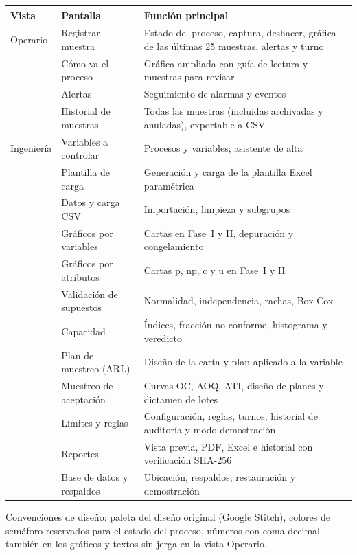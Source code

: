 \documentclass[11pt,a4paper]{article}
\begin{document}
\begin{tabularx}{\linewidth}{@{}P{2.1cm}P{4.4cm}L@{}}
\toprule
\textbf{Vista} & \textbf{Pantalla} & \textbf{Función principal}\\
\midrule
Operario & Registrar muestra & Estado del proceso, captura, deshacer, gráfica de las últimas 25 muestras, alertas y turno\\
 & Cómo va el proceso & Gráfica ampliada con guía de lectura y muestras para revisar\\
 & Alertas & Seguimiento de alarmas y eventos\\
 & Historial de muestras & Todas las muestras (incluidas archivadas y anuladas), exportable a CSV\\
\midrule
Ingeniería & Variables a controlar & Procesos y variables; asistente de alta\\
 & Plantilla de carga & Generación y carga de la plantilla Excel paramétrica\\
 & Datos y carga CSV & Importación, limpieza y subgrupos\\
 & Gráficos por variables & Cartas en Fase~I y II, depuración y congelamiento\\
 & Gráficos por atributos & Cartas p, np, c y u en Fase~I y II\\
 & Validación de supuestos & Normalidad, independencia, rachas, Box-Cox\\
 & Capacidad & Índices, fracción no conforme, histograma y veredicto\\
 & Plan de muestreo (ARL) & Diseño de la carta y plan aplicado a la variable\\
 & Muestreo de aceptación & Curvas OC, AOQ, ATI, diseño de planes y dictamen de lotes\\
 & Límites y reglas & Configuración, reglas, turnos, historial de auditoría y modo demostración\\
 & Reportes & Vista previa, PDF, Excel e historial con verificación SHA-256\\
 & Base de datos y respaldos & Ubicación, respaldos, restauración y demostración\\
\bottomrule
\end{tabularx}

Convenciones de diseño: paleta del diseño original (Google Stitch), colores de semáforo
reservados para el estado del proceso, números con coma decimal también en los gráficos y
textos sin jerga en la vista Operario.

\end{document}
